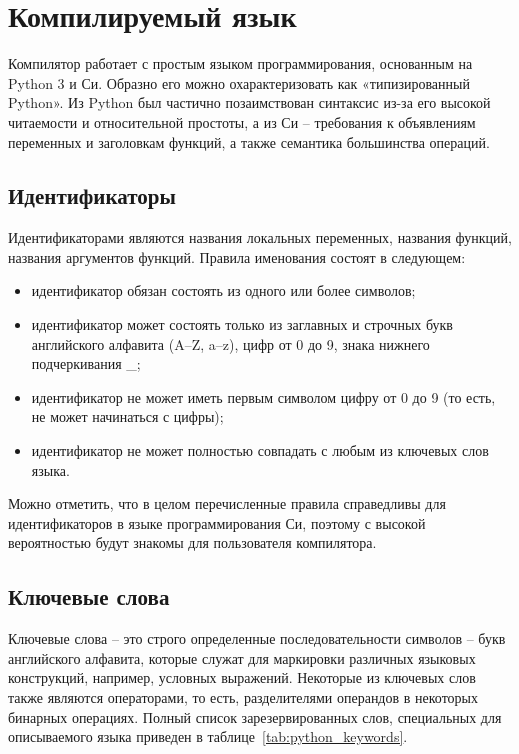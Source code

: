 \newpage
\section{Компилируемый язык}
\label{sec:language}

Компилятор работает с простым языком программирования, основанным на Python 3 и Си.
Образно его можно охарактеризовать как «типизированный Python».
Из Python был частично позаимствован синтаксис из-за его высокой читаемости и относительной простоты, а из Си -- требования к объявлениям переменных и заголовкам функций, а также семантика большинства операций.

\subsection{Идентификаторы}

Идентификаторами являются названия локальных переменных, названия функций, названия аргументов функций.
Правила именования состоят в следующем:

\begin{itemize}
    \item идентификатор обязан состоять из одного или более символов;
    \item идентификатор может состоять только из заглавных и строчных букв английского алфавита (A--Z, a--z), цифр от 0 до 9, знака нижнего подчеркивания \_;
    \item идентификатор не может иметь первым символом цифру от 0 до 9 (то есть, не может начинаться с цифры);
    \item идентификатор не может полностью совпадать с любым из ключевых слов языка.

\end{itemize}

Можно отметить, что в целом перечисленные правила справедливы для идентификаторов в языке программирования Си, поэтому с высокой вероятностью будут знакомы для пользователя компилятора.

\subsection{Ключевые слова}

Ключевые слова -- это строго определенные последовательности символов -- букв английского алфавита, которые служат для маркировки различных языковых конструкций, например, условных выражений.
Некоторые из ключевых слов также являются операторами, то есть, разделителями операндов в некоторых бинарных операциях.
Полный список зарезервированных слов, специальных для описываемого языка приведен в таблице~\ref{tab:python_keywords}.

